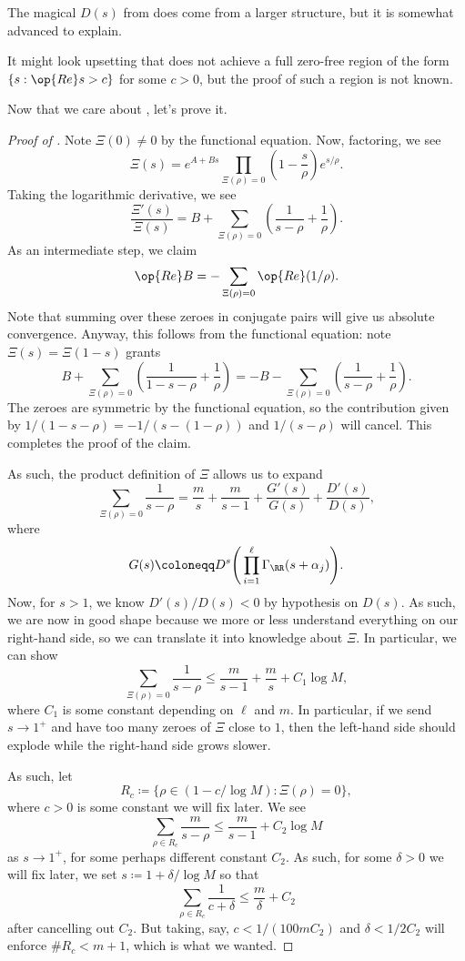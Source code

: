 \documentclass[../notes.tex]{subfiles}
\begin{document}
\begin{remark}
	The magical $D(s)$ from  does come from a larger structure, but it is somewhat advanced to explain.
\end{remark}
\begin{remark}
	It might look upsetting that  does not achieve a full zero-free region of the form $\{s:\op{Re}s>c\}$ for some $c>0$, but the proof of such a region is not known.
\end{remark}
Now that we care about , let's prove it.
\begin{proof}[Proof of ]
	Note $\Xi(0)\ne0$ by the functional equation. Now, factoring, we see
	\[\Xi(s)=e^{A+Bs}\prod_{\Xi(\rho)=0}\left(1-\frac s\rho\right)e^{s/\rho}.\]
	Taking the logarithmic derivative, we see
	\[\frac{\Xi'(s)}{\Xi(s)}=B+\sum_{\Xi(\rho)=0}\left(\frac1{s-\rho}+\frac1\rho\right).\]
	As an intermediate step, we claim
	\[\op{Re}B=-\sum_{\Xi(\rho)=0}\op{Re}(1/\rho).\]
	Note that summing over these zeroes in conjugate pairs will give us absolute convergence. Anyway, this follows from the functional equation: note $\Xi(s)=\Xi(1-s)$ grants
	\[B+\sum_{\Xi(\rho)=0}\left(\frac1{1-s-\rho}+\frac1\rho\right)=-B-\sum_{\Xi(\rho)=0}\left(\frac1{s-\rho}+\frac1\rho\right).\]
	The zeroes are symmetric by the functional equation, so the contribution given by $1/(1-s-\rho)=-1/(s-(1-\rho))$ and $1/(s-\rho)$ will cancel. This completes the proof of the claim.

	As such, the product definition of $\Xi$ allows us to expand
	\[\sum_{\Xi(\rho)=0}\frac1{s-\rho}=\frac ms+\frac m{s-1}+\frac{G'(s)}{G(s)}+\frac{D'(s)}{D(s)},\]
	where
	\[G(s)\coloneqq D^s\Bigg(\prod_{i=1}^\ell\Gamma_\RR(s+\alpha_j)\Bigg).\]
	Now, for $s>1$, we know $D'(s)/D(s)<0$ by hypothesis on $D(s)$. As such, we are now in good shape because we more or less understand everything on our right-hand side, so we can translate it into knowledge about $\Xi$. In particular, we can show
	\[\sum_{\Xi(\rho)=0}\frac1{s-\rho}\le\frac m{s-1}+\frac ms+C_1\log M,\]
	where $C_1$ is some constant depending on $\ell$ and $m$. In particular, if we send $s\to1^+$ and have too many zeroes of $\Xi$ close to $1$, then the left-hand side should explode while the right-hand side grows slower.

	As such, let
	\[R_c\coloneqq\{\rho\in(1-c/\log M):\Xi(\rho)=0\},\]
	where $c>0$ is some constant we will fix later. We see
	\[\sum_{\rho\in R_c}\frac m{s-\rho}\le\frac m{s-1}+C_2\log M\]
	as $s\to1^+$, for some perhaps different constant $C_2$. As such, for some $\delta>0$ we will fix later, we set $s\coloneqq1+\delta/\log M$ so that
	\[\sum_{\rho\in R_c}\frac1{c+\delta}\le\frac m\delta+C_2\]
	after cancelling out $C_2$. But taking, say, $c<1/(100mC_2)$ and $\delta<1/2C_2$ will enforce $\#R_c<m+1$, which is what we wanted.
\end{proof}
\end{document}
